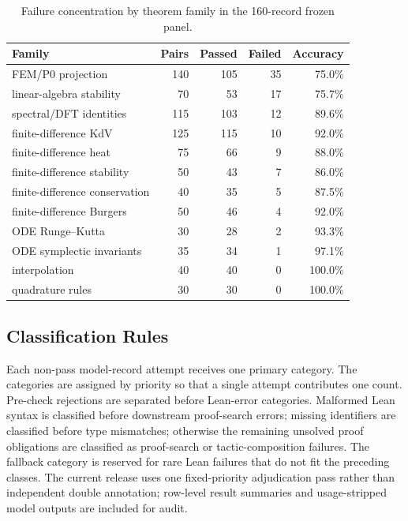 \begin{table}[htbp]
\centering
\caption{Failure concentration by theorem family in the 160-record frozen panel.}
\label{tab:supp-failure-by-family}
\small
\begin{tabular}{lrrrr}
\toprule
Family & Pairs & Passed & Failed & Accuracy\\
\midrule
FEM/P0 projection & 140 & 105 & 35 & 75.0\%\\
linear-algebra stability & 70 & 53 & 17 & 75.7\%\\
spectral/DFT identities & 115 & 103 & 12 & 89.6\%\\
finite-difference KdV & 125 & 115 & 10 & 92.0\%\\
finite-difference heat & 75 & 66 & 9 & 88.0\%\\
finite-difference stability & 50 & 43 & 7 & 86.0\%\\
finite-difference conservation & 40 & 35 & 5 & 87.5\%\\
finite-difference Burgers & 50 & 46 & 4 & 92.0\%\\
ODE Runge--Kutta & 30 & 28 & 2 & 93.3\%\\
ODE symplectic invariants & 35 & 34 & 1 & 97.1\%\\
interpolation & 40 & 40 & 0 & 100.0\%\\
quadrature rules & 30 & 30 & 0 & 100.0\%\\
\bottomrule
\end{tabular}
\end{table}

\subsection{Classification Rules}

Each non-pass model-record attempt receives one primary category. The
categories are assigned by priority so that a single attempt contributes one
count. Pre-check rejections are separated before Lean-error categories.
Malformed Lean syntax is classified before downstream proof-search errors;
missing identifiers are classified before type mismatches; otherwise the
remaining unsolved proof obligations are classified as proof-search or
tactic-composition failures. The fallback category is reserved for rare Lean
failures that do not fit the preceding classes. The current release uses one
fixed-priority adjudication pass rather than independent double annotation;
row-level result summaries and usage-stripped model outputs are included for
audit.

